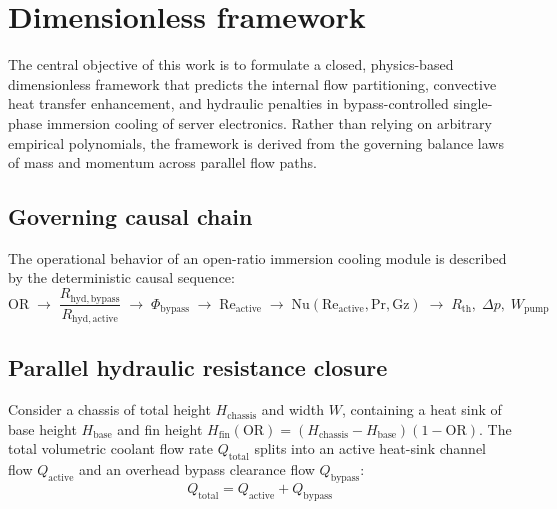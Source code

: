 
\section{Dimensionless framework}
\label{sec:dimensionless_framework}

The central objective of this work is to formulate a closed, physics-based dimensionless framework that predicts the internal flow partitioning, convective heat transfer enhancement, and hydraulic penalties in bypass-controlled single-phase immersion cooling of server electronics. Rather than relying on arbitrary empirical polynomials, the framework is derived from the governing balance laws of mass and momentum across parallel flow paths.

\subsection{Governing causal chain}
\label{sec:causal_chain}

The operational behavior of an open-ratio immersion cooling module is described by the deterministic causal sequence:
\begin{equation}
\mathrm{OR} \;\longrightarrow\; \frac{R_{\mathrm{hyd,bypass}}}{R_{\mathrm{hyd,active}}} \;\longrightarrow\; \Phi_{\mathrm{bypass}} \;\longrightarrow\; \mathrm{Re}_{\mathrm{active}} \;\longrightarrow\; \mathrm{Nu}(\mathrm{Re}_{\mathrm{active}}, \mathrm{Pr}, \mathrm{Gz}) \;\longrightarrow\; R_{\mathrm{th}}, \; \Delta p, \; W_{\mathrm{pump}}
\label{eq:causal_chain}
\end{equation}

\subsection{Parallel hydraulic resistance closure}
\label{sec:hyd_resistance_closure}

Consider a chassis of total height $H_{\mathrm{chassis}}$ and width $W$, containing a heat sink of base height $H_{\mathrm{base}}$ and fin height $H_{\mathrm{fin}}(\mathrm{OR}) = (H_{\mathrm{chassis}} - H_{\mathrm{base}})(1 - \mathrm{OR})$. The total volumetric coolant flow rate $Q_{\mathrm{total}}$ splits into an active heat-sink channel flow $Q_{\mathrm{active}}$ and an overhead bypass clearance flow $Q_{\mathrm{bypass}}$:
\begin{equation}
Q_{\mathrm{total}} = Q_{\mathrm{active}} + Q_{\mathrm{bypass}}
\label{eq:flow_split_sum}
\end{equation}

